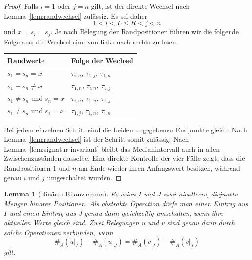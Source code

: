 \documentclass[12pt]{article}
\newtheorem{lemma}[satz]{Lemma}
\newcommand{\teamcount}[2]{\#_{#1}(#2)}
\begin{document}
\begin{proof}
Falls $i=1$ oder $j=n$ gilt, ist der direkte Wechsel nach
Lemma~\ref{lem:randwechsel} zulässig. Es sei daher
\[
1<i<L\le R<j<n
\]
und $x=s_i=s_j$. Je nach Belegung der Randpositionen führen wir die folgende
Folge aus; die Wechsel sind von links nach rechts zu lesen.

\begin{center}
\begin{tabularx}{\textwidth}{@{}>{\raggedright\arraybackslash}X
                                  >{\raggedright\arraybackslash}X@{}}
\toprule
Randwerte & Folge der Wechsel \\
\midrule
$s_1=s_n=x$
  & $\tau_{i,n},\ \tau_{1,j},\ \tau_{1,n}$ \\
$s_1=s_n\ne x$
  & $\tau_{1,n},\ \tau_{i,n},\ \tau_{1,j}$ \\
$s_1\ne s_n$ und $s_n=x$
  & $\tau_{i,n},\ \tau_{1,n},\ \tau_{1,j}$ \\
$s_1\ne s_n$ und $s_1=x$
  & $\tau_{1,j},\ \tau_{1,n},\ \tau_{i,n}$ \\
\bottomrule
\end{tabularx}
\end{center}

Bei jedem einzelnen Schritt sind die beiden angegebenen Endpunkte gleich.
Nach Lemma~\ref{lem:randwechsel} ist der Schritt somit zulässig. Nach
Lemma~\ref{lem:signatur-invariant} bleibt das Medianintervall auch in allen
Zwischenzuständen dasselbe. Eine direkte Kontrolle der vier Fälle zeigt, dass
die Randpositionen $1$ und $n$ am Ende wieder ihren Anfangswert besitzen,
während genau $i$ und $j$ umgeschaltet wurden.
\end{proof}

\begin{lemma}[Binäres Bilanzlemma]
\label{lem:bilanz}
Es seien $I$ und $J$ zwei nichtleere, disjunkte Mengen binärer Positionen.
Als abstrakte Operation dürfe man einen Eintrag aus $I$ und einen Eintrag aus
$J$ genau dann gleichzeitig umschalten, wenn ihre aktuellen Werte gleich
sind. Zwei Belegungen $u$ und $v$ sind genau dann durch solche Operationen
verbunden, wenn
\[
\teamcount{A}{u|_I}-\teamcount{A}{u|_J}
=
\teamcount{A}{v|_I}-\teamcount{A}{v|_J}
\]
gilt.
\end{lemma}
\end{document}

